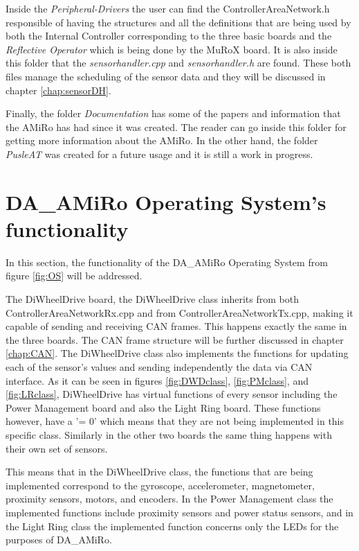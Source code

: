 \documentclass[12pt]{report}%
\begin{document}
Inside the \textit{Peripheral-Drivers} the user can find the ControllerAreaNetwork.h responsible of having the structures and all the definitions that are being used by both the Internal Controller corresponding to the three basic boards and the \textit{Reflective Operator} which is being done by the MuRoX board. It is also inside this folder that the \textit{sensorhandler.cpp} and \textit{sensorhandler.h} are found. These both files manage the scheduling of the sensor data and they will be discussed in chapter \ref{chap:sensorDH}.

Finally, the folder \textit{Documentation} has some of the papers and information that the AMiRo has had since it was created. The reader can go inside this folder for getting more information about the AMiRo. In the other hand, the folder \textit{PusleAT} was created for a future usage and it is still a work in progress.

\section{DA\_AMiRo Operating System's functionality}
\label{sub:DAAMIROOS}
In this section, the functionality of the DA\_AMiRo Operating System from figure \ref{fig:OS} will be addressed.

The DiWheelDrive board, the DiWheelDrive class inherits from both ControllerAreaNetworkRx.cpp and from ControllerAreaNetworkTx.cpp, making it capable of sending and receiving CAN frames. This happens exactly the same in the three boards. The CAN frame structure will be further discussed in chapter \ref{chap:CAN}. The DiWheelDrive class also implements the functions for updating each of the sensor's values and sending independently the data via CAN interface. As it can be seen in figures \ref{fig:DWDclass}, \ref{fig:PMclass}, and \ref{fig:LRclass}, DiWheelDrive has virtual functions of every sensor including the Power Management board and also the Light Ring board. These functions however, have a '= 0' which means that they are not being implemented in this specific class. Similarly in the other two boards the same thing happens with their own set of sensors.

This means that in the DiWheelDrive class, the functions that are being implemented correspond to the gyroscope, accelerometer, magnetometer, proximity sensors, motors, and encoders. In the Power Management class the implemented functions include proximity sensors and power status sensors, and in the Light Ring class the implemented function concerns only the LEDs for the purposes of DA\_AMiRo.
\end{document}
